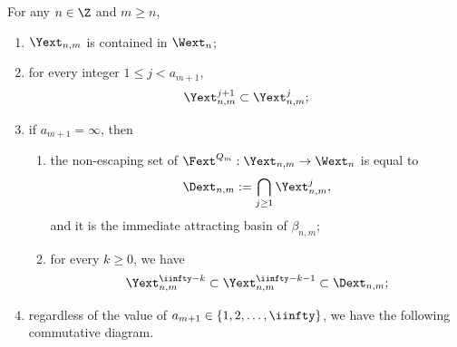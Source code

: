 \documentclass{amsart}
\begin{document}
\begin{lemma}
\label{lem:non-esc-parab}
    For any $n \in \Z$ and $m \geq n$,
    \begin{enumerate}[label = \textnormal{(\arabic*)}]
        \item $\Yext_{n,m}$ is contained in $\Wext_n$;
        \item for every integer $1 \leq j < a_{m+1}$,
        \[
        \Yext^{j+1}_{n,m} \subset \Yext^j_{n,m};
        \]
        \item if $a_{m+1}=\infty$, then
        \begin{enumerate}[label=\textnormal{(\alph*)}]
            \item the non-escaping set of $\Fext^{Q_m}: \Yext_{n,m} \to \Wext_n$ is equal to 
            \[
            \Dext_{n,m} := \bigcap_{j\geq 1} \Yext^j_{n,m},
            \]
            and it is the immediate attracting basin of $\beta_{n,m}$;
            \item for every $k \geq 0$, we have 
            \[
            \Yext^{\iinfty-k}_{n,m} \subset \Yext^{\iinfty-k-1}_{n,m} \subset \Dext_{n,m};
            \]
        \end{enumerate}
        \item regardless of the value of $a_{m+1} \in \{1,2,\ldots,\iinfty\}$, we have the following commutative diagram.
\begin{center}
\end{center}
    \end{enumerate}
\end{lemma}
\end{document}
